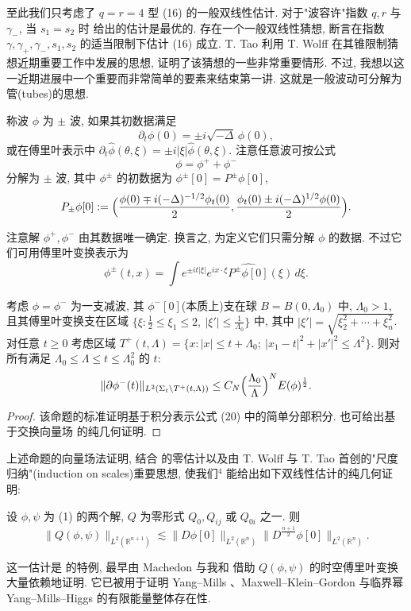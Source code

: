 至此我们只考虑了 $q = r = 4$ 型 (16) 的一般双线性估计. 对于"波容许"指数 $q, r$ 与 $\gamma_{-}$, 当 $s_{1} = s_{2}$ 时 给出的估计是最优的. 存在一个一般双线性猜想, 断言在指数 $\gamma, \gamma_{+}, \gamma_{-}, s_1, s_2$ 的适当限制下估计 (16) 成立. T. Tao \cite{klai68} 利用 T. Wolff \cite{klai76} 在其锥限制猜想近期重要工作中发展的思想, 证明了该猜想的一些非常重要情形. 不过, 我想以这一近期进展中一个重要而非常简单的要素来结束第一讲. 这就是一般波动可分解为管(tubes)的思想.
\begin{definition}\label{def:1.25}
称波 $\phi$ 为 $\pm$ 波, 如果其初数据满足
\[
\partial_{t}\phi(0)=\pm i\sqrt{-\Delta}\,\phi(0),
\]
或在傅里叶表示中 $\partial_t\hat\phi(\theta,\xi) = \pm i|\xi|\hat\phi(\theta,\xi)$. 注意任意波可按公式
\[
\phi=\phi^{+}+\phi^{-}
\]
分解为 $\pm$ 波, 其中 $\phi^{\pm}$ 的初数据为 $\phi^{\pm}[0] = P^{\pm}\phi[0]$,
\[
P_{\pm}\phi[0]:=\Bigl(\frac{\phi(0)\mp i(-\Delta)^{-1/2}\phi_{t}(0)}{2},\frac{\phi_{t}(0)\pm i(-\Delta)^{1/2}\phi(0)}{2}\Bigr).
\]
\end{definition}

\begin{remark}\label{rem:1.26}
注意解 $\phi^+, \phi^-$ 由其数据唯一确定. 换言之, 为定义它们只需分解 $\phi$ 的数据. 不过它们可用傅里叶变换表示为
\[
\phi^{\pm}(t,x)=\int e^{\pm i t|\xi|}e^{i x\cdot\xi}\widehat{P^{\pm}\phi[0]}(\xi)\,d\xi.
\]
\end{remark}

\begin{proposition}\label{prop:1.27}
考虑 $\phi = \phi^{-}$ 为一支减波, 其 $\phi^{-}[0]$(本质上)支在球 $B = B(0, \Lambda_0)$ 中, $\Lambda_0 > 1$, 且其傅里叶变换支在区域 $\{\xi: \frac{1}{2} \leq \xi_1 \leq 2,\ |\xi'| \leq \frac{1}{\Lambda_0}\}$ 中, 其中 $|\xi'| = \sqrt{\xi_2^2 + \cdots + \xi_n^2}$. 对任意 $t \geq 0$ 考虑区域 $T^+(t, \Lambda) = \{x: |x| \leq t + \Lambda_0;\ |x_1 - t|^2 + |x'|^2 \leq \Lambda^2\}$. 则对所有满足 $\Lambda_0 \leq \Lambda \leq t \leq \Lambda_0^2$ 的 $t$:
\[
\|\partial\phi^{-}(t)\|_{L^{2}(\Sigma_{t}\backslash T^+(t,\Lambda))}\leq C_{N}\Bigl(\frac{\Lambda_{0}}{\Lambda}\Bigr)^{N}E(\phi)^{\frac{1}{2}}.
\]
\end{proposition}

\begin{proof}
该命题的标准证明基于积分表示公式 (20) 中的简单分部积分. 也可给出基于交换向量场 \cite{klai43} 的纯几何证明.\end{proof}

上述命题的向量场法证明, 结合 的零估计以及由 T. Wolff \cite{klai76} 与 T. Tao \cite{klai68} 首创的"尺度归纳"(induction on scales)重要思想, 使我们$^{4}$ 能给出如下双线性估计的纯几何证明:
\begin{proposition}\label{prop:1.28}
设 $\phi, \psi$ 为 (1) 的两个解, $Q$ 为零形式 $Q_{0}, Q_{ij}$ 或 $Q_{0i}$ 之一. 则
\[
\|Q(\phi,\psi)\|_{L^{2}(\mathbb{R}^{n+1})}\lesssim\|D\phi[0]\|_{L^{2}(\mathbb{R}^{n})}\|D^{\frac{n+1}{2}}\phi[0]\|_{L^{2}(\mathbb{R}^{n})}.
\]
\end{proposition}

这一估计是 的特例, 最早由 Machedon 与我和 \cite{klai31} 借助 $Q(\phi, \psi)$ 的时空傅里叶变换大量依赖地证明. 它已被用于证明 Yang--Mills \cite{klai34}、Maxwell--Klein--Gordon \cite{klai33} 与临界幂 Yang--Mills--Higgs \cite{klai19} 的有限能量整体存在性.

